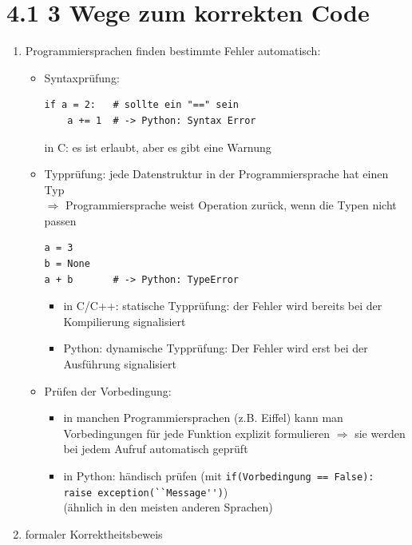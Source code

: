 \documentclass[11pt, fleqn]{scrreprt}
\begin{document}
\section*{4.1 3 Wege zum korrekten Code}
    \begin{enumerate}
        \item Programmiersprachen finden bestimmte Fehler automatisch:
        \begin{itemize}
            \item Syntaxprüfung:
            \begin{verbatim}
if a = 2:   # sollte ein "==" sein
    a += 1  # -> Python: Syntax Error
            \end{verbatim}
            in C: es ist erlaubt, aber es gibt eine Warnung
            \item Typprüfung: jede Datenstruktur in der Programmiersprache hat einen Typ \\
            $\Rightarrow$ Programmiersprache weist Operation zurück, wenn die Typen nicht passen
            \begin{verbatim}
a = 3
b = None
a + b       # -> Python: TypeError
            \end{verbatim}
            \begin{itemize}
                \item in C/C++: statische Typprüfung: der Fehler wird bereits bei der Kompilierung signalisiert
                \item Python: dynamische Typprüfung: Der Fehler wird erst bei der Ausführung signalisiert
            \end{itemize}
            \item Prüfen der Vorbedingung:
            \begin{itemize}
                \item in manchen Programmiersprachen (z.B. Eiffel) kann man Vorbedingungen für jede Funktion explizit formulieren $\Rightarrow$ sie werden bei jedem Aufruf automatisch geprüft
                \item in Python: händisch prüfen (mit \verb|if(Vorbedingung == False): |\\ \verb|raise exception(``Message'')|)\\
                (ähnlich in den meisten anderen Sprachen)
            \end{itemize}
        \end{itemize}
        \item formaler Korrektheitsbeweis \\

\end{enumerate}
\end{document}
